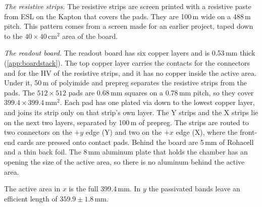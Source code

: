 \emph{The resistive strips.} The resistive strips are screen printed with a resistive paste from ESL on the Kapton
that covers the pads. They are 100\,\textmu m wide on a 488\,\textmu m pitch. This pattern comes from a screen made
for an earlier project, taped down to the $40\times40$\,cm$^2$ area of the board.

\emph{The readout board.} The readout board has six copper layers and is 0.53\,mm thick
(\cref{app:boardstack}). The top copper layer carries the contacts for the connectors and for the HV of the
resistive strips, and it has no copper inside the active area. Under it, 50\,\textmu m of polyimide and prepreg
separates the resistive strips from the pads. The $512\times512$ pads are 0.68\,mm squares on a 0.78\,mm pitch, so
they cover $399.4\times399.4$\,mm$^2$. Each pad has one plated via down to the lowest copper layer, and joins its
strip only on that strip's own layer. The Y strips and the X strips lie on the next two layers, separated by
100\,\textmu m of prepreg. The strips are routed to two connectors on the $+y$ edge (Y) and two on the $+x$ edge (X),
where the front-end cards are pressed onto contact pads. Behind the board are 5\,mm of Rohacell and a thin back foil.
The 8\,mm aluminum plate that holds the chamber has an opening the size of the active area, so there is no aluminum
behind the active area.

The active area in $x$ is the full 399.4\,mm. In $y$ the passivated bands leave an efficient length of
$359.9\pm1.8$\,mm.

